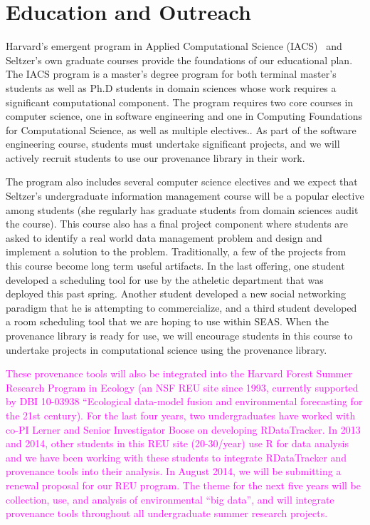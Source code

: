 \documentclass[10pt]{article}
\begin{document}
\section{Education and Outreach}


Harvard's emergent program in Applied Computational Science
(IACS)~\cite{iacs} and
Seltzer's own graduate courses provide the foundations of our
educational plan.
The IACS program is a master's degree program for both terminal
master's students as well as Ph.D students in domain sciences whose
work requires a significant computational component.
The program requires two core courses in computer science,
one in software engineering and one in Computing Foundations for
Computational Science, as well as multiple electives..
As part of the software engineering course, students must undertake
significant projects, and we will actively recruit students to use our
provenance library in their work.

The program also includes several computer science electives and we
expect that Seltzer's undergraduate information management course
will be a popular elective among students (she regularly has graduate
students from domain sciences audit the course).
This course also has a final project component where students are asked
to identify a real world data management problem and design and
implement a solution to the problem.
Traditionally, a few of the projects from this course become long term
useful artifacts.
In the last offering, one student developed a scheduling tool for use
by the atheletic department that was deployed this past spring.
Another student developed a new social networking paradigm that he
is attempting to commercialize,
and a third student developed a room scheduling tool that we are
hoping to use within SEAS.
When the provenance library is ready for use, we will encourage
students in this course to undertake projects 
in computational science using the provenance library.

\textcolor{magenta}{These provenance tools will also be integrated
into the Harvard Forest Summer Research Program in Ecology (an NSF REU
site since 1993, currently supported by DBI 10-03938 ``Ecological
data-model fusion and environmental forecasting for the 21st
century). For the last four years, two undergraduates have worked with
co-PI Lerner and Senior Investigator Boose on developing
RDataTracker. In 2013 and 2014, other students in this REU site
(20-30/year) use R for data analysis and we have been working with
these students to integrate RDataTracker and provenance tools into
their analysis. In August 2014, we will be submitting a renewal
proposal for our REU program. The theme for the next five years will
be collection, use, and analysis of environmental ``big data'', and
will integrate provenance tools throughout all undergraduate summer
research projects.}
\end{document}
